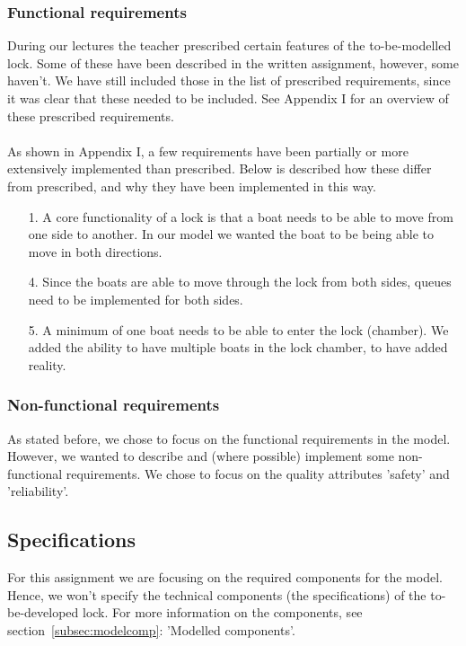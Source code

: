 \documentclass{article}
\begin{document}
        \subsubsection{Functional requirements}
        During our lectures the teacher prescribed certain features of the to-be-modelled lock. Some of these have been described in the written assignment, however, some haven't. We have still included those in the list of prescribed requirements, since it was clear that these needed to be included. See Appendix I for an overview of these prescribed requirements.\\\\
        As shown in Appendix I, a few requirements have been partially or more extensively implemented than prescribed. Below is described how these differ from prescribed, and why they have been implemented in this way.
        
        \begin{itemize}
            \item[1.]  A core functionality of a lock is that a boat needs to be able to move from one side to another. In our model we wanted the boat to be being able to move in both directions.
            \item[4.] Since the boats are able to move through the lock from both sides, queues need to be implemented for both sides.
            \item[5.] A minimum of one boat needs to be able to enter the lock (chamber). We added the ability to have multiple boats in the lock chamber, to have added reality.  
        \end{itemize}
        
        \subsubsection{Non-functional requirements}
        As stated before, we chose to focus on the functional requirements in the model. However, we wanted to describe and (where possible) implement some non-functional requirements. We chose to focus on the quality attributes 'safety' and 'reliability'. 
        
       \subsection{Specifications}
        For this assignment we are focusing on the required components for the model. Hence, we won't specify the technical components (the specifications) of the to-be-developed lock. For more information on the components, see section~\ref{subsec:modelcomp}: 'Modelled components'.  
        
\end{document}
